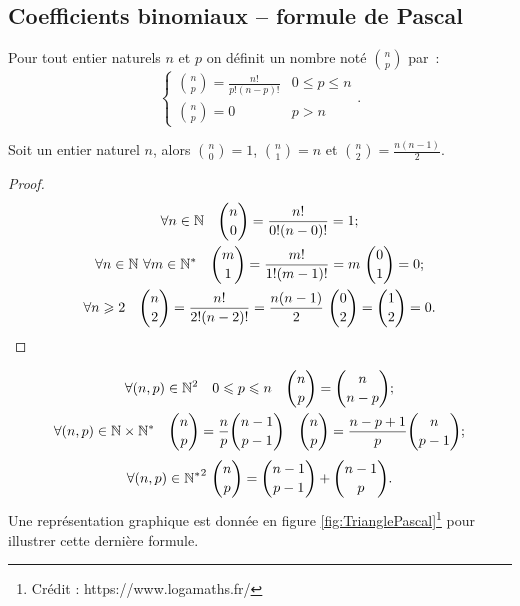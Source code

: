 \subsection{Coefficients binomiaux -- formule de Pascal}

\begin{defdef}
  Pour tout entier naturels \(n\) et \(p\) on définit un nombre noté \(\binom{n}{p}\) par~:
  \begin{equation}
    \begin{cases}
      \binom{n}{p}=\frac{n!}{p!(n-p)!} & 0\leqslant p \leqslant n \\
      \binom{n}{p}=0 & p > n
    \end{cases}.
  \end{equation}
\end{defdef}
\begin{prop}
  Soit un entier naturel \(n\), alors \(\binom{n}{0}=1\), \(\binom{n}{1}=n\) et \(\binom{n}{2}=\frac{n(n-1)}{2}\).
\end{prop}
\begin{proof}
  \begin{gather}
    \forall n \in \N \quad \binom{n}{0}=\frac{n!}{0!(n-0)!}=1; \\
    \forall n \in \N \ \forall m\in \N^* \quad \binom{m}{1}=\frac{m!}{1!(m-1)!}=m \ \binom{0}{1}=0;\\
    \forall n \geqslant 2 \quad \binom{n}{2}=\frac{n!}{2!(n-2)!}=\frac{n(n-1)}{2} \ \binom{0}{2}=\binom{1}{2}=0.
  \end{gather}
\end{proof}
\begin{prop}
  \begin{gather}
    \forall (n,p)\in\mathbb{N}^2 \quad 0\leqslant p \leqslant n \quad \binom{n}{p}=\binom{n}{n-p};\\
    \forall (n,p)\in\mathbb{N}\times\mathbb{N}^* \quad \binom{n}{p}=\frac{n}{p}\binom{n-1}{p-1} \quad \binom{n}{p}=\frac{n-p+1}{p}\binom{n}{p-1};
  \end{gather}
  \begin{equation}
      \label{eq:TrianglePascal}
    \forall (n,p)\in{\N^*}^2 \ \binom{n}{p}=\binom{n-1}{p-1}+\binom{n-1}{p}.
  \end{equation}
  Une représentation graphique est donnée en figure \ref{fig:TrianglePascal}\footnote{Crédit : https://www.logamaths.fr/} pour illustrer cette dernière formule.
\end{prop}
